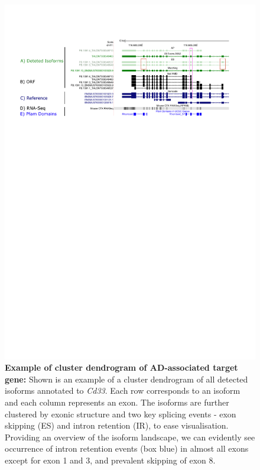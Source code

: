 \begin{figure}[htp]
	\centering
	\includegraphics[page=2,trim={1cm 19cm 0 0},scale = 0.85]{Figures/ExamplePlots.pdf}
	\captionsetup{width=0.95\textwidth, singlelinecheck=off}
	\caption[Example of cluster dendrogram of AD-associated target gene]%
	{\textbf{Example of cluster dendrogram of AD-associated target gene:} Shown is an example of a cluster dendrogram of all detected isoforms annotated to \textit{Cd33}. Each row corresponds to an isoform and each column represents an exon. The isoforms are further clustered by exonic structure and two key splicing events - exon skipping (ES) and intron retention (IR), to ease visualisation. Providing an overview of the isoform landscape, we can evidently see occurrence of intron retention events (box blue) in almost all exons except for exon 1 and 3, and prevalent skipping of exon 8. 
	}   
	\label{fig:eg_heatmap}
\end{figure}

